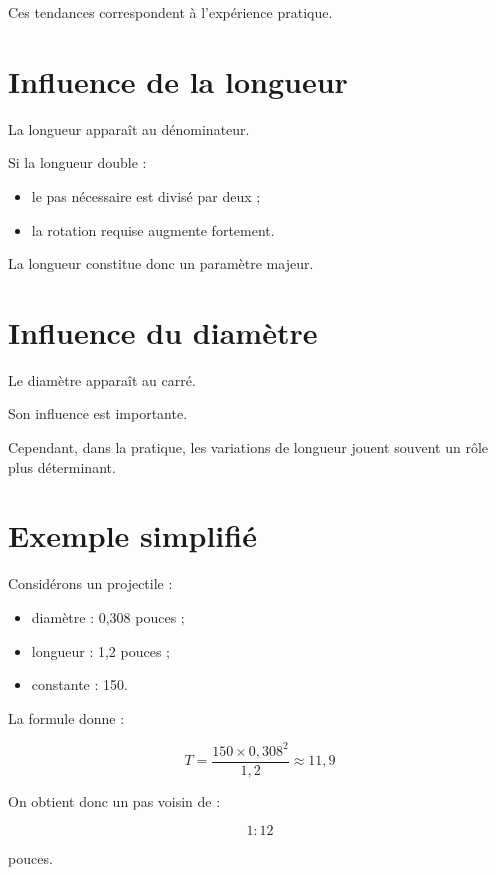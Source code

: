 Ces tendances correspondent à l'expérience pratique.

\section{Influence de la longueur}

La longueur apparaît au dénominateur.

Si la longueur double :

\begin{itemize}
    \item le pas nécessaire est divisé par deux ;
    \item la rotation requise augmente fortement.
\end{itemize}

La longueur constitue donc un paramètre majeur.

\section{Influence du diamètre}

Le diamètre apparaît au carré.

Son influence est importante.

Cependant, dans la pratique, les variations de longueur jouent souvent un rôle
plus déterminant.

\section{Exemple simplifié}

Considérons un projectile :

\begin{itemize}
    \item diamètre : 0,308 pouces ;
    \item longueur : 1,2 pouces ;
    \item constante : 150.
\end{itemize}

La formule donne :

\begin{equation}
T=
\frac{150\times0,308^2}
     {1,2}
\approx11,9
\end{equation}

On obtient donc un pas voisin de :

\begin{equation}
1:12
\end{equation}

pouces.

